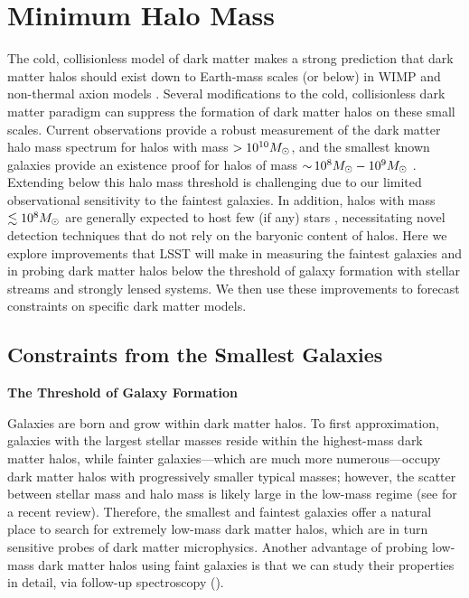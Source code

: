 \section{Minimum Halo Mass}
\label{sec:halo_mass}

The cold, collisionless model of dark matter makes a strong prediction that dark matter halos should exist down to Earth-mass scales (or below) in WIMP and non-thermal axion models \citep{Green:2003un,2005Natur.433..389D,1412.5930}.
Several modifications to the cold, collisionless dark matter paradigm can suppress the formation of dark matter halos on these small scales.
Current observations provide a robust measurement of the dark matter halo mass spectrum for halos with mass $> 10^{10}M_\odot$, and the smallest known galaxies provide an existence proof for halos of mass $ {\sim}\, 10^8 M_\odot - 10^9 M_\odot$ \citep{2017MNRAS.467.2019R,behroozi2018,Jethwa:2018,Kim:2017iwr,Nadler:2018,1807.07093}. 
Extending below this halo mass threshold is challenging due to our limited observational sensitivity to the faintest galaxies.
In addition, halos with mass $\lesssim 10^8 M_\odot$ are generally expected to host few (if any) stars \citep{1102.4638,1505.06209}, necessitating novel detection techniques that do not rely on the baryonic content of halos.
Here we explore improvements that LSST will make in measuring the faintest galaxies and in probing dark matter halos below the threshold of galaxy formation with stellar streams and strongly lensed systems. We then use these improvements to forecast constraints on specific dark matter models.

\subsection{Constraints from the Smallest Galaxies } 
\label{sec:smallest_galaxies}


\vspace{1em} \noindent \textbf{The Threshold of Galaxy Formation}

Galaxies are born and grow within dark matter halos.
To first approximation, galaxies with the largest stellar masses reside within the highest-mass dark matter halos, while fainter galaxies---which are much more numerous---occupy dark matter halos with progressively smaller typical masses; however, the scatter between stellar mass and halo mass is likely large in the low-mass regime (see \citealt{Wechsler:2018} for a recent review).
Therefore, the smallest and faintest galaxies offer a natural place to search for extremely low-mass dark matter halos, which are in turn sensitive probes of dark matter microphysics. Another advantage of probing low-mass dark matter halos using faint galaxies is that we can study their properties in detail, \eg via follow-up spectroscopy ().

